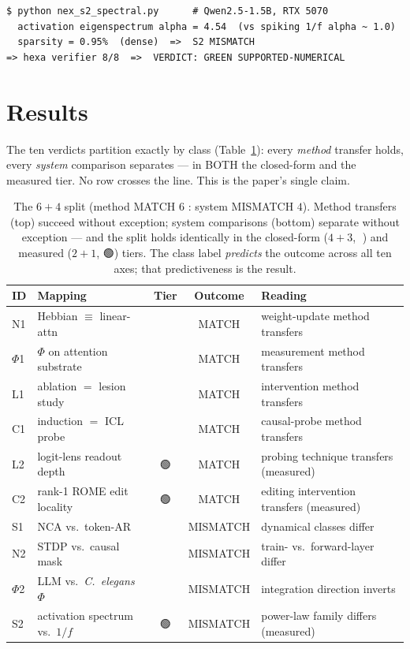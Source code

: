 \documentclass[11pt,a4paper]{article}
\providecommand{\tierBlue}{🔵}
\providecommand{\tierGreen}{🟢}
\begin{document}
\begin{lstlisting}[basicstyle=\ttfamily\scriptsize,frame=single,xleftmargin=0pt]
$ python nex_s2_spectral.py      # Qwen2.5-1.5B, RTX 5070
  activation eigenspectrum alpha = 4.54  (vs spiking 1/f alpha ~ 1.0)
  sparsity = 0.95%  (dense)  =>  S2 MISMATCH
=> hexa verifier 8/8  =>  VERDICT: GREEN SUPPORTED-NUMERICAL
\end{lstlisting}

\section{Results}
\label{sec:results}

The ten verdicts partition exactly by class
(Table~\ref{tab:results}): every \emph{method} transfer holds, every
\emph{system} comparison separates --- in BOTH the closed-form and the
measured tier. No row crosses the line. This is the paper's single claim.

\begin{table}[h]
\centering
\small
\begin{tabular}{llccl}
\toprule
\textbf{ID} & \textbf{Mapping} & \textbf{Tier} & \textbf{Outcome} & \textbf{Reading} \\
\midrule
N1     & Hebbian $\equiv$ linear-attn      & \tierBlue  & MATCH    & weight-update method transfers \\
$\Phi$1 & $\Phi$ on attention substrate    & \tierBlue  & MATCH    & measurement method transfers \\
L1     & ablation $=$ lesion study         & \tierBlue  & MATCH    & intervention method transfers \\
C1     & induction $=$ ICL probe           & \tierBlue  & MATCH    & causal-probe method transfers \\
L2     & logit-lens readout depth          & \tierGreen & MATCH    & probing technique transfers (measured) \\
C2     & rank-1 ROME edit locality         & \tierGreen & MATCH    & editing intervention transfers (measured) \\
S1     & NCA vs.\ token-AR                 & \tierBlue  & MISMATCH & dynamical classes differ \\
N2     & STDP vs.\ causal mask             & \tierBlue  & MISMATCH & train- vs.\ forward-layer differ \\
$\Phi$2 & LLM vs.\ \emph{C.\ elegans} $\Phi$ & \tierBlue & MISMATCH & integration direction inverts \\
S2     & activation spectrum vs.\ $1/f$    & \tierGreen & MISMATCH & power-law family differs (measured) \\
\bottomrule
\end{tabular}
\caption{The $6{+}4$ split (method MATCH $6$ : system MISMATCH $4$).
Method transfers (top) succeed without exception; system comparisons
(bottom) separate without exception --- and the split holds identically
in the closed-form ($4{+}3$, $\tierBlue$) and measured ($2{+}1$,
$\tierGreen$) tiers. The class label \emph{predicts} the outcome across
all ten axes; that predictiveness is the result.}
\label{tab:results}
\end{table}
\end{document}
